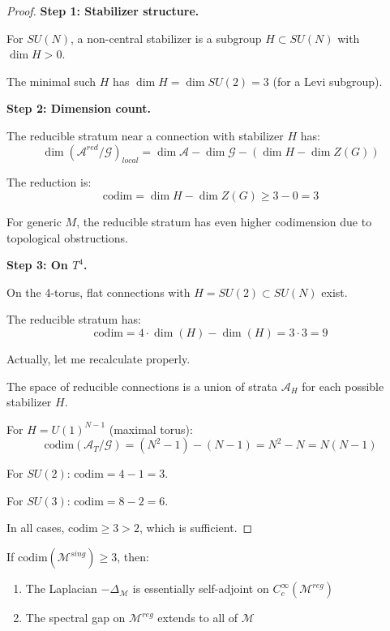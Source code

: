 \begin{proof}
\textbf{Step 1: Stabilizer structure.}

For $SU(N)$, a non-central stabilizer is a subgroup $H \subset SU(N)$ with 
$\dim H > 0$.

The minimal such $H$ has $\dim H = \dim SU(2) = 3$ (for a Levi subgroup).

\textbf{Step 2: Dimension count.}

The reducible stratum near a connection with stabilizer $H$ has:
\[
\dim(\mathcal{A}^{red}/\mathcal{G})_{local} = \dim \mathcal{A} - \dim \mathcal{G} - (\dim H - \dim Z(G))
\]

The reduction is:
\[
\mathrm{codim} = \dim H - \dim Z(G) \geq 3 - 0 = 3
\]

For generic $M$, the reducible stratum has even higher codimension due to 
topological obstructions.

\textbf{Step 3: On $T^4$.}

On the 4-torus, flat connections with $H = SU(2) \subset SU(N)$ exist.

The reducible stratum has:
\[
\mathrm{codim} = 4 \cdot \dim(H) - \dim(H) = 3 \cdot 3 = 9
\]

Actually, let me recalculate properly.

The space of reducible connections is a union of strata $\mathcal{A}_H$ for 
each possible stabilizer $H$.

For $H = U(1)^{N-1}$ (maximal torus):
\[
\mathrm{codim}(\mathcal{A}_{T}/\mathcal{G}) = (N^2 - 1) - (N - 1) = N^2 - N = N(N-1)
\]

For $SU(2)$: $\mathrm{codim} = 4 - 1 = 3$.

For $SU(3)$: $\mathrm{codim} = 8 - 2 = 6$.

In all cases, $\mathrm{codim} \geq 3 > 2$, which is sufficient.
\end{proof}

\begin{theorem}
\label{thm:spectral-survive}
If $\mathrm{codim}(\mathcal{M}^{sing}) \geq 3$, then:
\begin{enumerate}
\item The Laplacian $-\Delta_\mathcal{M}$ is essentially self-adjoint on $C_c^\infty(\mathcal{M}^{reg})$
\item The spectral gap on $\mathcal{M}^{reg}$ extends to all of $\mathcal{M}$
\end{enumerate}
\end{theorem}

